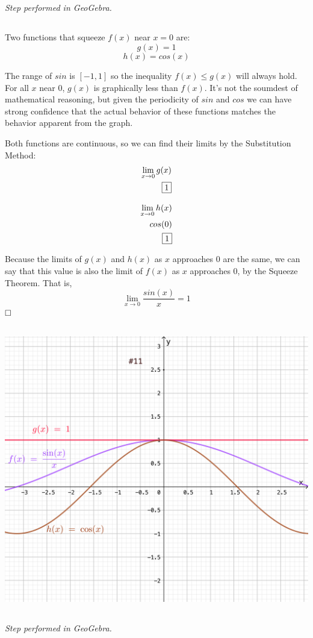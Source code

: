 \documentclass{article}
\begin{document}
\subsection{}
\emph{Step performed in GeoGebra.}

\subsection{}
Two functions that squeeze $f(x)$ near $x=0$ are:
$$g(x)=1$$
$$h(x)=cos(x)$$

The range of $sin$ is $[-1,1]$ so the inequality $f(x) \leq g(x)$ will always hold. For all $x$ near 0, $g(x)$ is graphically less than $f(x)$. It's not the soumdest of mathematical reasoning, but given the periodicity of $sin$ and $cos$ we can have strong confidence that the actual behavior of these functions matches the behavior apparent from the graph.

Both functions are continuous, so we can find their limits by the Substitution Method:
\begin{align}
  \lim_{x \rightarrow 0}g(x) \notag \\
  \boxed{1} \notag
\end{align}

\begin{align}
  \lim_{x \rightarrow 0}h(x) \notag \\
  cos(0) \notag \\
  \boxed{1} \notag
\end{align}

Because the limits of $g(x)$ and $h(x)$ as $x$ approaches 0 are the same, we can say that this value is also the limit of $f(x)$ as $x$ approaches 0, by the Squeeze Theorem. That is,
$$
\lim_{x \rightarrow 0} \frac{sin(x)}{x} = \boxed{1}
$$
$\hfill \square$

\subsection{}
\includegraphics[width=\textwidth]{cl3-11}

\subsection{}
\emph{Step performed in GeoGebra.}
\end{document}
